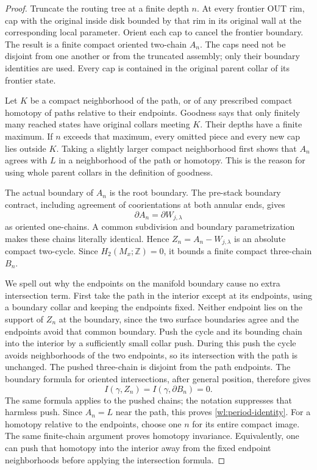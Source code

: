 \documentclass[11pt]{article}
\numberwithin{equation}{section}
\theoremstyle{definition}
\theoremstyle{remark}
\begin{document}
\begin{proof}
Truncate the routing tree at a finite depth $n$.  At every frontier OUT rim,
cap with the original inside disk bounded by that rim in its original wall
at the corresponding local parameter.  Orient each cap to cancel the
frontier boundary.  The result is a finite compact oriented two-chain $A_n$.
The caps need not be disjoint from one another or from the truncated assembly;
only their boundary identities are used.  Every cap is contained in the
original parent collar of its frontier state.

Let $K$ be a compact neighborhood of the path, or of any prescribed compact
homotopy of paths relative to their endpoints.  Goodness says that only
finitely many reached states have original collars meeting $K$.  Their
depths have a finite maximum.  If $n$ exceeds that maximum, every omitted
piece and every new cap lies outside $K$.  Taking a slightly larger compact
neighborhood first shows that $A_n$ agrees with $L$ in a neighborhood of the
path or homotopy.  This is the reason for using whole parent collars in the
definition of goodness.

The actual boundary of $A_n$ is the root boundary.  The pre-stack boundary
contract, including agreement of coorientations at both annular ends, gives
\[
                     \partial A_n=\partial W_{j,\lambda}
\]
as oriented one-chains.  A common subdivision and boundary parametrization
makes these chains literally identical.  Hence
$Z_n=A_n-W_{j,\lambda}$ is an absolute compact two-cycle.  Since
$H_2(M_x;\mathbb Z)=0$, it bounds a finite compact three-chain $B_n$.

We spell out why the endpoints on the manifold boundary cause no extra
intersection term.  First take the path in the interior except at its
endpoints, using a boundary collar and keeping the endpoints fixed.  Neither
endpoint lies on the support of $Z_n$ at the boundary, since the two surface
boundaries agree and the endpoints avoid that common boundary.  Push the
cycle and its bounding chain into the interior by a sufficiently small
collar push.  During this push the cycle avoids neighborhoods of the two
endpoints, so its intersection with the path is unchanged.  The pushed
three-chain is disjoint from the path endpoints.  The boundary formula for
oriented intersections, after general position, therefore gives
\[
                  I(\gamma,Z_n)
                    =I(\gamma,\partial B_n)=0.
\]
The same formula applies to the pushed chains; the notation suppresses that
harmless push.  Since $A_n=L$ near the path, this proves
\eqref{wl:period-identity}.  For a homotopy relative to the endpoints, choose
one $n$ for its entire compact image.  The same finite-chain argument proves
homotopy invariance.  Equivalently, one can push that homotopy into the
interior away from the fixed endpoint neighborhoods before applying the
intersection formula.


\end{proof}
\end{document}

